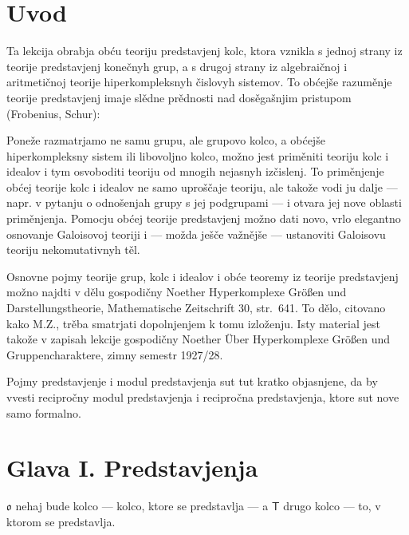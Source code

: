 \documentclass[11pt]{article}
\newcommand{\foreign}[1]{#1}
\begin{document}
\clearpage
\section*{Uvod}\label{einleitung}

Ta lekcija obrabja obću teoriju predstavjenj kolc, ktora vznikla s
jednoj strany iz teorije predstavjenj konečnyh grup, a s drugoj strany
iz algebraičnoj i aritmetičnoj teorije hiperkompleksnyh čislovyh
sistemov. To obćejše razuměnje teorije predstavjenj imaje slědne
prědnosti nad dosěgašnjim pristupom (\foreign{Frobenius},
\foreign{Schur}):

Poneže razmatrjamo ne samu grupu, ale grupovo kolco, a obćejše
hiperkompleksny sistem ili libovoljno kolco, možno jest priměniti
teoriju kolc i idealov i tym osvoboditi teoriju od mnogih nejasnyh
izčislenj. To priměnjenje obćej teorije kolc i idealov ne samo
uproščaje teoriju, ale takože vodi ju dalje --- napr. v pytanju o
odnošenjah grupy s jej podgrupami --- i otvara jej nove oblasti
priměnjenja. Pomocju obćej teorije predstavjenj možno dati novo, vrlo
elegantno osnovanje Galoisovoj teoriji i --- možda ješče važnějše ---
ustanoviti Galoisovu teoriju nekomutativnyh těl.

Osnovne pojmy teorije grup, kolc i idealov i obće teoremy iz teorije
predstavjenj možno najdti v dělu gospodičny \foreign{Noether}
\foreign{Hyperkomplexe Größen und Darstellungstheorie},
\foreign{Mathematische Zeitschrift} 30, str.~641. To dělo, citovano
kako \foreign{M.Z.}, trěba smatrjati dopolnjenjem k tomu izloženju.
Isty material jest takože v zapisah lekcije gospodičny
\foreign{Noether} \foreign{Über Hyperkomplexe Größen und
Gruppencharaktere}, zimny semestr 1927/28.

Pojmy predstavjenje i modul predstavjenja sut tut kratko objasnjene,
da by vvesti recipročny modul predstavjenja i recipročna
predstavjenja, ktore sut nove samo formalno.

\section*{Glava I. Predstavjenja}\label{kapitel-i.-darstellungen}

$\mathfrak{o}$ nehaj bude kolco --- kolco, ktore se predstavlja --- a
$\mathsf T$ drugo kolco --- to, v ktorom se predstavlja.
\end{document}
